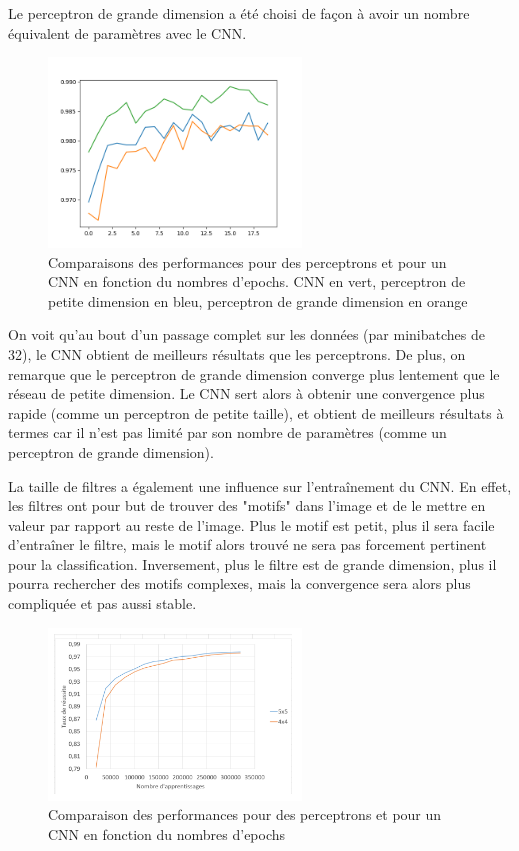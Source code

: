 Le perceptron de grande dimension a été choisi de façon à avoir un nombre équivalent de paramètres avec le CNN.


\begin{figure}[h]
    \center 
    \includegraphics[width=0.6\textwidth]{img/fc_vs_cnn.png}
    \caption{Comparaisons des performances pour des perceptrons et pour un CNN en fonction du nombres d'epochs. 
    CNN en vert, perceptron de petite dimension en bleu, perceptron de grande dimension en orange}
\end{figure}

On voit qu'au bout d'un passage complet sur les données (par minibatches de 32), le CNN obtient de meilleurs résultats que les 
perceptrons. De plus, on remarque que le perceptron de grande dimension converge plus lentement que le réseau de petite dimension.
Le CNN sert alors à obtenir une convergence plus rapide (comme un perceptron de petite taille),
et obtient de meilleurs résultats à termes car il n'est pas limité par son nombre de paramètres (comme un perceptron de grande dimension).

\newpage
La taille de filtres a également une influence sur l'entraînement du CNN. En effet, les filtres ont pour but de trouver des "motifs" dans l'image et de le mettre en valeur par rapport au reste de l'image. Plus le motif est petit, plus il sera facile d'entraîner le filtre, mais le motif alors trouvé ne sera pas forcement pertinent pour la classification. Inversement, plus le filtre est de grande dimension, plus il pourra rechercher des motifs complexes, mais la convergence sera alors plus compliquée et pas aussi stable.


\begin{figure}[h]
    \center 
    \includegraphics[width=0.6\textwidth]{img/comparaison_filtres.png}
    \caption{Comparaison des performances pour des perceptrons et pour un CNN en fonction du nombres d'epochs}
\end{figure}

